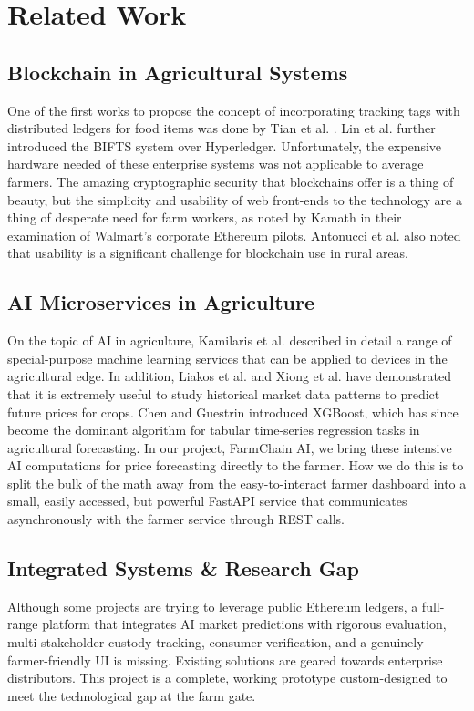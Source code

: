 \documentclass[conference]{IEEEtran}
\begin{document}
\section{Related Work}

\subsection{Blockchain in Agricultural Systems}
One of the first works to propose the concept of incorporating tracking tags with distributed ledgers for food items was done by Tian et al. \cite{tian2017agrifood}. Lin et al. \cite{lin2019bifts} further introduced the BIFTS system over Hyperledger. Unfortunately, the expensive hardware needed of these enterprise systems was not applicable to average farmers. The amazing cryptographic security that blockchains offer is a thing of beauty, but the simplicity and usability of web front-ends to the technology are a thing of desperate need for farm workers, as noted by Kamath \cite{kamath2018food} in their examination of Walmart's corporate Ethereum pilots. Antonucci et al. \cite{antonucci2019review} also noted that usability is a significant challenge for blockchain use in rural areas.

\subsection{AI Microservices in Agriculture}
On the topic of AI in agriculture, Kamilaris et al. \cite{kamilaris2018deep} described in detail a range of special-purpose machine learning services that can be applied to devices in the agricultural edge. In addition, Liakos et al. \cite{liakos2018ml} and Xiong et al. \cite{xiong2020price} have demonstrated that it is extremely useful to study historical market data patterns to predict future prices for crops. Chen and Guestrin \cite{chen2016xgboost} introduced XGBoost, which has since become the dominant algorithm for tabular time-series regression tasks in agricultural forecasting. In our project, FarmChain AI, we bring these intensive AI computations for price forecasting directly to the farmer. How we do this is to split the bulk of the math away from the easy-to-interact farmer dashboard into a small, easily accessed, but powerful FastAPI service that communicates asynchronously with the farmer service through REST calls.

\subsection{Integrated Systems \& Research Gap}
Although some projects are trying to leverage public Ethereum ledgers, a full-range platform that integrates AI market predictions with rigorous evaluation, multi-stakeholder custody tracking, consumer verification, and a genuinely farmer-friendly UI is missing. Existing solutions are geared towards enterprise distributors. This project is a complete, working prototype custom-designed to meet the technological gap at the farm gate.
\end{document}
